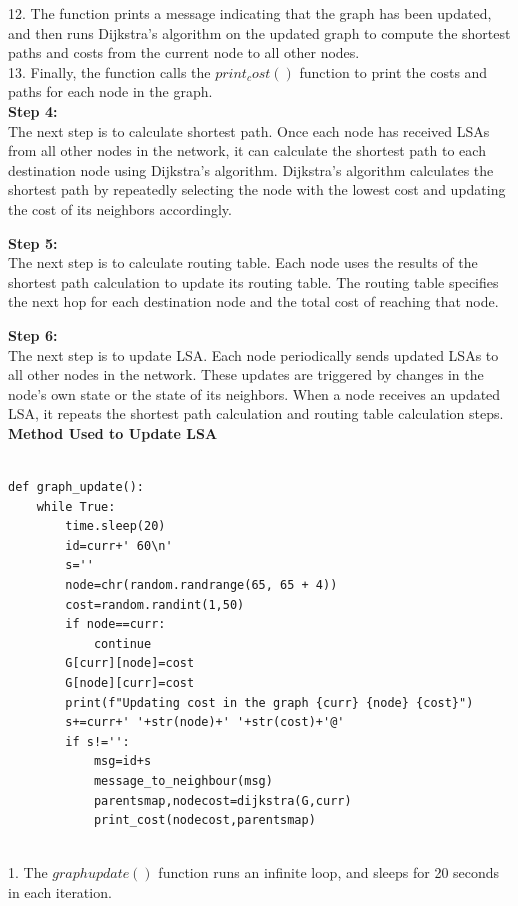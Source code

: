 \documentclass[11pt]{article}
\begin{document}
    12. The function prints a message indicating that the graph has been updated, and then runs Dijkstra's algorithm on the updated graph to compute the shortest paths and costs from the current node to all other nodes.\\

    13. Finally, the function calls the $print_cost()$ function to print the costs and paths for each node in the graph.\\



\textbf{Step 4: }\\[12pt]
The next step is to calculate shortest path. Once each node has received LSAs from all other nodes in the network, it can calculate the shortest path to each destination node using Dijkstra's algorithm. Dijkstra's algorithm calculates the shortest path by repeatedly selecting the node with the lowest cost and updating the cost of its neighbors accordingly.

\textbf{Step 5: }\\[12pt]
The next step is to calculate routing table. Each node uses the results of the shortest path calculation to update its routing table. The routing table specifies the next hop for each destination node and the total cost of reaching that node.

\textbf{Step 6: }\\[12pt]
The next step is to update LSA. Each node periodically sends updated LSAs to all other nodes in the network. These updates are triggered by changes in the node's own state or the state of its neighbors. When a node receives an updated LSA, it repeats the shortest path calculation and routing table calculation steps.\\[12pt]
\textbf{Method Used to Update LSA }\\[12pt] 
\begin{verbatim}

def graph_update():
	while True:
		time.sleep(20)
		id=curr+' 60\n'
		s=''
		node=chr(random.randrange(65, 65 + 4))
		cost=random.randint(1,50)
		if node==curr:
			continue
		G[curr][node]=cost
		G[node][curr]=cost
		print(f"Updating cost in the graph {curr} {node} {cost}")
		s+=curr+' '+str(node)+' '+str(cost)+'@'
		if s!='':
			msg=id+s
			message_to_neighbour(msg)
			parentsmap,nodecost=dijkstra(G,curr)
			print_cost(nodecost,parentsmap)
\end{verbatim}
\\
    1. The $graph update()$ function runs an infinite loop, and sleeps for 20 seconds in each iteration.\\
\end{document}
